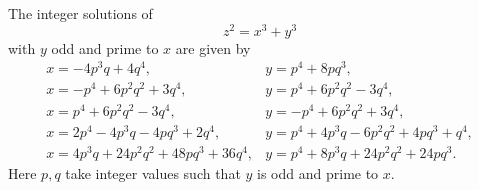 \begin{proposition}
    The integer solutions of
\[
    z^2=x^3+y^3
\]
    with $y$ odd and prime to $x$ are given by
\[
    \begin{array}{ll}
    x=-4p^3q+4q^4, & y=p^4+8pq^3,\\
    x=-p^4+6p^2q^2+3q^4, & y=p^4+6p^2q^2-3q^4,\\
    x=p^4+6p^2q^2-3q^4, & y=-p^4+6p^2q^2+3q^4,\\
    x=2p^4-4p^3q-4pq^3+2q^4, & y=p^4+4p^3q-6p^2q^2+4pq^3+q^4,\\
    x=4p^3q+24p^2q^2+48pq^3+36q^4, & y=p^4+8p^3q+24p^2q^2+24pq^3.
    \end{array}
\]
    Here $p,q$ take integer values such that $y$ is odd and prime to $x$.
\end{proposition}
